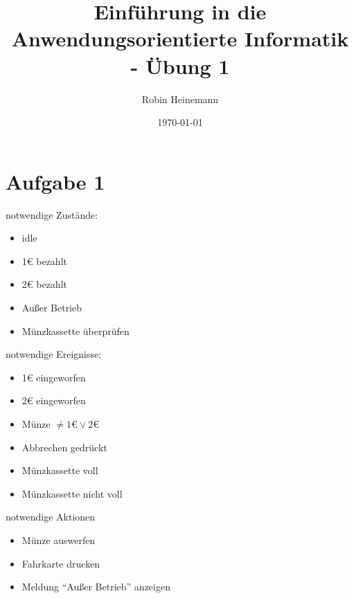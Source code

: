 \documentclass[koma,a4paper,10pt]{scrartcl}
\author{Robin Heinemann}
\date{\today}
\title{Einführung in die Anwendungsorientierte Informatik - Übung 1}
\begin{document}
\maketitle

\section{Aufgabe 1}
\label{sec-1}
notwendige Zustände:
\begin{itemize}
\item idle
\item 1€ bezahlt
\item 2€ bezahlt
\item Außer Betrieb
\item Münzkassette überprüfen
\end{itemize}
notwendige Ereignisse:
\begin{itemize}
\item 1€ eingeworfen
\item 2€ eingeworfen
\item Münze $\neq 1€ \vee 2€$
\item Abbrechen gedrückt
\item Münzkassette voll
\item Münzkassette nicht voll
\end{itemize}
notwendige Aktionen
\begin{itemize}
\item Münze auswerfen
\item Fahrkarte drucken
\item Meldung "`Außer Betrieb"' anzeigen
\end{itemize}
\end{document}
